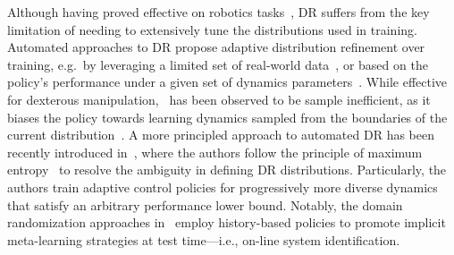 Although having proved effective on robotics tasks~\citep{antonova2017reinforcement}, DR suffers from the key limitation of needing to extensively tune the distributions used in training. Automated approaches to DR propose adaptive distribution refinement over training, e.g.~by leveraging a limited set of real-world data~\cite{tiboniadrbenchmark,tiboni2023dropo}, or based on the policy's performance under a given set of dynamics parameters~\citep{akkaya2019solving}. While effective for dexterous manipulation,~\cite{akkaya2019solving} has been observed to be sample inefficient, as it biases the policy towards learning dynamics sampled from the boundaries of the current distribution~\citep{tiboni2023domain}. A more principled approach to automated DR has been recently introduced in~\cite{tiboni2023domain}, where the authors follow the principle of maximum entropy~\citep{jaynes1957information} to resolve the ambiguity in defining DR distributions. Particularly, the authors train adaptive control policies for progressively more diverse dynamics that satisfy an arbitrary performance lower bound.
Notably, the domain randomization approaches in~\cite{akkaya2019solving,tiboni2023domain} employ history-based policies to promote implicit meta-learning strategies at test time---i.e., on-line system identification.


